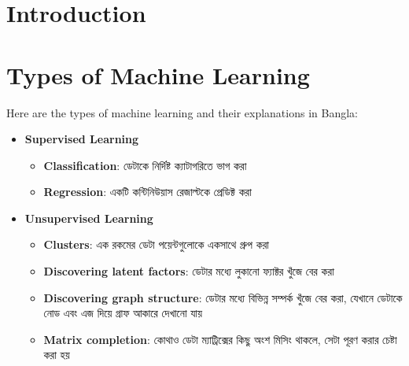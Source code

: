 \documentclass{article}  %
\begin{document}
\section{Introduction}

\section{Types of Machine Learning}
Here are the types of machine learning and their explanations in Bangla:

\begin{itemize}
    \item \textbf{Supervised Learning}
    \begin{itemize}
        \item \textbf{Classification}: {\bengalifont ডেটাকে নির্দিষ্ট ক্যাটাগরিতে ভাগ করা}
        \item \textbf{Regression}: {\bengalifont একটি কন্টিনিউয়াস রেজাল্টকে প্রেডিক্ট করা}
    \end{itemize}
    \item \textbf{Unsupervised Learning}
    \begin{itemize}
        \item \textbf{Clusters}: {\bengalifont এক রকমের ডেটা পয়েন্টগুলোকে একসাথে গ্রুপ করা}
        \item \textbf{Discovering latent factors}: {\bengalifont ডেটার মধ্যে লুকানো ফ্যাক্টর খুঁজে বের করা}
        \item \textbf{Discovering graph structure}: {\bengalifont ডেটার মধ্যে বিভিন্ন সম্পর্ক খুঁজে বের করা, যেখানে ডেটাকে নোড এবং এজ দিয়ে গ্রাফ আকারে দেখানো যায়}
        \item \textbf{Matrix completion}: {\bengalifont কোথাও ডেটা ম্যাট্রিক্সের কিছু অংশ মিসিং থাকলে, সেটা পূরণ করার চেষ্টা করা হয়}
    \end{itemize}
\end{itemize}
\end{document}
